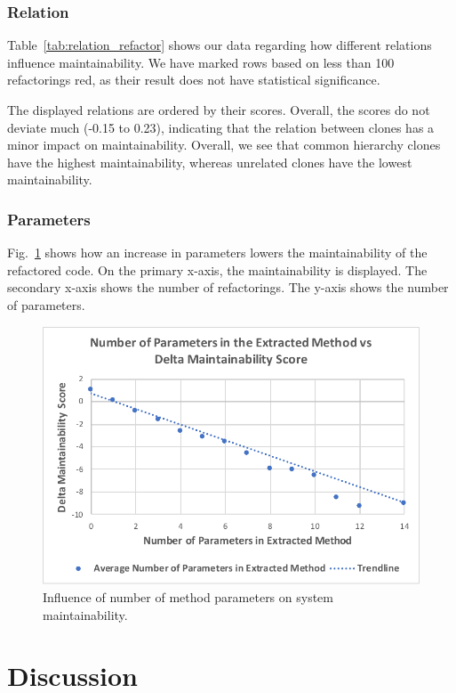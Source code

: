 \documentclass[]{IEEEtran}
\begin{document}
\subsubsection{Relation}
Table~\ref{tab:relation_refactor} shows our data regarding how different relations influence maintainability. We have marked rows based on less than 100 refactorings red, as their result does not have statistical significance.

The displayed relations are ordered by their scores. Overall, the scores do not deviate much (-0.15 to 0.23), indicating that the relation between clones has a minor impact on maintainability. Overall, we see that common hierarchy clones have the highest maintainability, whereas unrelated clones have the lowest maintainability.

\subsubsection{Parameters}
Fig.~\ref{fig:arguments} shows how an increase in parameters lowers the maintainability of the refactored code. On the primary x-axis, the maintainability is displayed. The secondary x-axis shows the number of refactorings. The y-axis shows the number of parameters.

\begin{figure}[H]
  \includegraphics[width=1\columnwidth]{img/arguments}
  \caption{Influence of number of method parameters on system maintainability.}
  \label{fig:arguments}
\end{figure}

\section{Discussion}
\end{document}
